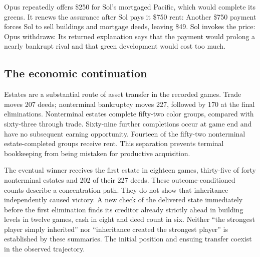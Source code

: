Opus repeatedly offers \$250 for Sol's mortgaged Pacific, which would complete its greens. It renews the assurance after Sol pays it \$750 rent:
Another \$750 payment forces Sol to sell buildings and mortgage deeds, leaving \$49. Sol invokes the price:
Opus withdraws:
Its returned explanation says that the payment would prolong a nearly bankrupt rival and that green development would cost too much.

\subsection{The economic continuation}

Estates are a substantial route of asset transfer in the recorded games. Trade moves 207 deeds; nonterminal bankruptcy moves 227, followed by 170 at the final eliminations. Nonterminal estates complete fifty-two color groups, compared with sixty-three through trade. Sixty-nine further completions occur at game end and have no subsequent earning opportunity. Fourteen of the fifty-two nonterminal estate-completed groups receive rent. This separation prevents terminal bookkeeping from being mistaken for productive acquisition.

The eventual winner receives the first estate in eighteen games, thirty-five of forty nonterminal estates and 202 of their 227 deeds. These outcome-conditioned counts describe a concentration path. They do not show that inheritance independently caused victory. A new check of the delivered state immediately before the first elimination finds its creditor already strictly ahead in building levels in twelve games, cash in eight and deed count in six. Neither ``the strongest player simply inherited'' nor ``inheritance created the strongest player'' is established by these summaries. The initial position and ensuing transfer coexist in the observed trajectory.

